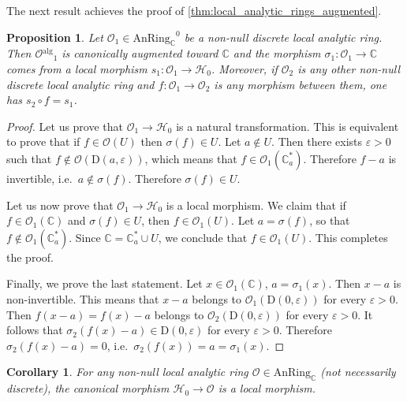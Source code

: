 \documentclass[12pt,a4paper,reqno]{amsart}
\theoremstyle{plain}
\newtheorem{prop}[thm]{Proposition}
\newtheorem{cor}[thm]{Corollary}
\theoremstyle{definition}
\theoremstyle{remark}
\numberwithin{equation}{section}
\begin{document}
The next result achieves the proof of \cref{thm:local_analytic_rings_augmented}.

\begin{prop}
	Let ${\mathcal O}_1 \in {\mathrm{AnRing}_{\mathbb C}}^0$ be a non-null discrete local analytic ring. Then ${\mathcal O}{^\mathrm{alg}}_1$ is canonically augmented toward $\mathbb C$ and the morphism $\sigma_1 \colon {\mathcal O}_1 \to \mathbb C$ comes from a \emph{local} morphism $s_1 \colon {\mathcal O}_1 \to {\mathcal H}_0$.
	Moreover, if ${\mathcal O}_2$ is any other non-null discrete local analytic ring and $f \colon {\mathcal O}_1 \to {\mathcal O}_2$ is any morphism between them, one has $s_2 \circ f = s_1$.
\end{prop}

\begin{proof}
	Let us prove that ${\mathcal O}_1 \to {\mathcal H}_0$ is a natural transformation. This is equivalent to prove that if $f \in {\mathcal O}(U)$ then $\sigma(f) \in U$. Let $a \not \in U$.
	Then there exists $\varepsilon > 0$ such that $f \not \in {\mathcal O}(\mathrm D(a, \varepsilon))$, which means that $f \in {\mathcal O}_1(\mathbb C^*_a)$. Therefore $f - a$ is invertible, i.e.\ $a \not \in \sigma(f)$. Therefore $\sigma(f) \in U$.
	
	Let us now prove that ${\mathcal O}_1 \to {\mathcal H}_0$ is a local morphism. We claim that if $f \in {\mathcal O}_1(\mathbb C)$ and $\sigma(f) \in U$, then $f \in {\mathcal O}_1(U)$.
	Let $a = \sigma(f)$, so that $f \not \in {\mathcal O}_1(\mathbb C^*_a)$. Since $\mathbb C = \mathbb C^*_a \cup U$, we conclude that $f \in {\mathcal O}_1(U)$. This completes the proof.
	
	Finally, we prove the last statement. Let $x \in {\mathcal O}_1(\mathbb C)$, $a = \sigma_1(x)$. Then $x - a$ is non-invertible. This means that $x-a$ belongs to ${\mathcal O}_1(\mathrm D(0, \varepsilon))$ for every $\varepsilon > 0$. Then $f(x - a) = f(x) - a$ belongs to ${\mathcal O}_2(\mathrm D(0, \varepsilon))$ for every $\varepsilon > 0$.
		It follows that $\sigma_2(f(x) - a) \in \mathrm D(0, \varepsilon)$ for every $\varepsilon > 0$.
		Therefore $\sigma_2(f(x) - a) = 0$, i.e.\ $\sigma_2(f(x)) = a = \sigma_1(x)$.
\end{proof}

\begin{cor}
	For any non-null local analytic ring ${\mathcal O} \in {\mathrm{AnRing}_{\mathbb C}}$ (not necessarily discrete), the canonical morphism ${\mathcal H}_0 \to {\mathcal O}$ is a local morphism.
\end{cor}
\end{document}

